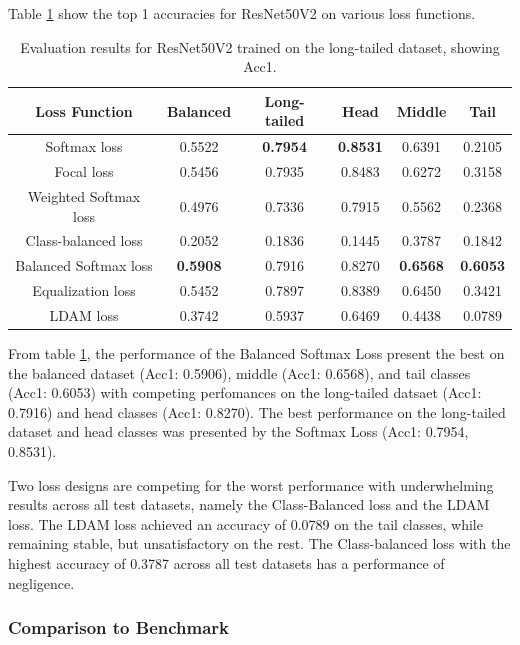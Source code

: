 Table \ref{tab:resnet_lt_acc1_1} show the top 1 accuracies for ResNet50V2 on various loss functions.

\begin{table}[H]
    \centering
    \caption{Evaluation results for ResNet50V2 trained on the long-tailed dataset, showing Acc1.}
    \begin{tabular}{cccccc}
        \toprule
        Loss Function & Balanced & Long-tailed & Head & Middle & Tail \\ 
        \midrule
        Softmax loss   & 0.5522 & \textbf{0.7954} & \textbf{0.8531} & 0.6391 & 0.2105 \\
        Focal loss   & 0.5456 & 0.7935 & 0.8483 & 0.6272 & 0.3158 \\
        Weighted Softmax loss   & 0.4976 & 0.7336 & 0.7915 & 0.5562 & 0.2368 \\
        Class-balanced loss   & 0.2052 & 0.1836 &  0.1445 & 0.3787 & 0.1842 \\
        Balanced Softmax loss   & \textbf{0.5908} & 0.7916 & 0.8270 & \textbf{0.6568} & \textbf{0.6053} \\
        Equalization loss   & 0.5452 & 0.7897 & 0.8389 & 0.6450 & 0.3421 \\
        LDAM loss   & 0.3742 & 0.5937 & 0.6469 & 0.4438 & 0.0789 \\
        \bottomrule
    \end{tabular}
    \label{tab:resnet_lt_acc1_1}
\end{table}


From table \ref{tab:resnet_lt_acc1_1}, the performance of the Balanced Softmax Loss present the best on the balanced dataset (Acc1: 0.5906), middle (Acc1: 0.6568), and tail classes (Acc1: 0.6053) with competing perfomances on the long-tailed datsaet (Acc1: 0.7916) and head classes (Acc1: 0.8270). The best performance on the long-tailed dataset and head classes was presented by the Softmax Loss (Acc1: 0.7954, 0.8531).

Two loss designs are competing for the worst performance with underwhelming results across all test datasets, namely the Class-Balanced loss and the LDAM loss. The LDAM loss achieved an accuracy of 0.0789 on the tail classes, while remaining stable, but unsatisfactory on the rest. The Class-balanced loss with the highest accuracy of 0.3787 across all test datasets has a performance of negligence.

\subsubsection{Comparison to Benchmark}

